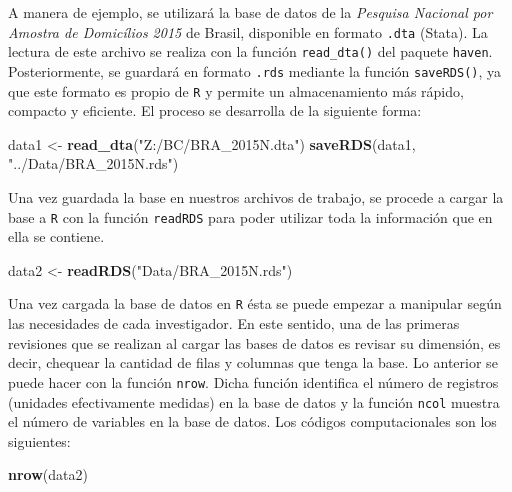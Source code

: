 \documentclass[
  spanish,
  12pt,
]{book}
\newenvironment{Shaded}{\begin{snugshade}}{\end{snugshade}}
\newcommand{\FunctionTok}[1]{\textcolor[rgb]{0.13,0.29,0.53}{\textbf{#1}}}
\newcommand{\NormalTok}[1]{#1}
\newcommand{\OtherTok}[1]{\textcolor[rgb]{0.56,0.35,0.01}{#1}}
\newcommand{\StringTok}[1]{\textcolor[rgb]{0.31,0.60,0.02}{#1}}
\begin{document}
A manera de ejemplo, se utilizará la base de datos de la \emph{Pesquisa Nacional por Amostra de Domicílios 2015 } de Brasil, disponible en formato \texttt{.dta} (Stata). La lectura de este archivo se realiza con la función \texttt{read\_dta()} del paquete \texttt{haven}. Posteriormente, se guardará en formato \texttt{.rds} mediante la función \texttt{saveRDS()}, ya que este formato es propio de \texttt{R} y permite un almacenamiento más rápido, compacto y eficiente. El proceso se desarrolla de la siguiente forma:

\begin{Shaded}
\begin{Highlighting}[]
\NormalTok{data1 }\OtherTok{\textless{}{-}} \FunctionTok{read\_dta}\NormalTok{(}\StringTok{"Z:/BC/BRA\_2015N.dta"}\NormalTok{)}
\FunctionTok{saveRDS}\NormalTok{(data1, }\StringTok{"../Data/BRA\_2015N.rds"}\NormalTok{)}
\end{Highlighting}
\end{Shaded}

Una vez guardada la base en nuestros archivos de trabajo, se procede a cargar la base a \texttt{R} con la función \texttt{readRDS} para poder utilizar toda la información que en ella se contiene.

\begin{Shaded}
\begin{Highlighting}[]
\NormalTok{data2 }\OtherTok{\textless{}{-}} \FunctionTok{readRDS}\NormalTok{(}\StringTok{"Data/BRA\_2015N.rds"}\NormalTok{)}
\end{Highlighting}
\end{Shaded}

Una vez cargada la base de datos en \texttt{R} ésta se puede empezar a manipular según las necesidades de cada investigador. En este sentido, una de las primeras revisiones que se realizan al cargar las bases de datos es revisar su dimensión, es decir, chequear la cantidad de filas y columnas que tenga la base. Lo anterior se puede hacer con la función \texttt{nrow}. Dicha función identifica el número de registros (unidades efectivamente medidas) en la base de datos y la función \texttt{ncol} muestra el número de variables en la base de datos. Los códigos computacionales son los siguientes:

\begin{Shaded}
\begin{Highlighting}[]
\FunctionTok{nrow}\NormalTok{(data2)}
\end{Highlighting}
\end{Shaded}
\end{document}
